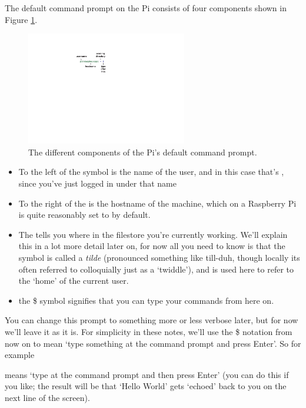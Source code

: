 The default command prompt on the Pi consists of four components shown in Figure \ref{figure:prompt}.

\begin{figure}
\centerline{\includegraphics[width=7cm]{images/default-prompt}}
\caption{The different components of the Pi's default command prompt.}\label{figure:prompt}
\end{figure}


\begin{itemize}
\item To the left of the  symbol is the name of the user, and in this case that's , since you've just logged in under that name
\item To the right of the  is the hostname of the machine, which on a Raspberry Pi is quite reasonably set to  by default.
\item The \texttildelow{} tells you where in the filestore you're currently working. We'll explain this in a lot more detail later on, for now all you need to know is that the \texttildelow{} symbol is called a \textit{tilde} (pronounced something like till-duh, though locally its often referred to colloquially just as a `twiddle'), and is used here to refer to the `home' of the current user. 
\item the \$ symbol signifies that you can type your commands from here on. 
\end{itemize}

You can change this prompt to something more or less verbose later, but for now we'll leave it as it is. For simplicity in these notes, we'll use the \$ notation from now on to mean `type something at the command prompt and press Enter'. So for example


\noindent means `type  at the command prompt and then press Enter' (you can do this if you like; the result will be that `Hello World' gets `echoed' back to you on the next line of the screen). 

